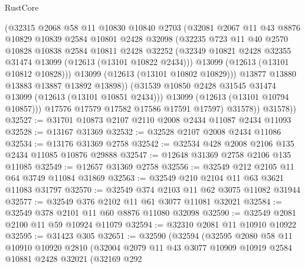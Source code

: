 \begin{lexlean}{RustCore}
\begin{coremodule}
                  (@32315
                    @2068
                    @58
                    @11
                    @10830
                    @10840
                    @2703
                    (@32081
                      @2067
                      @11
                      @43
                      @8876
                      @10829
                      @10839
                      @2584
                      @10801
                      @2428
                      @32098
                      (@32235
                        @723
                        @11
                        @40
                        @2570
                        @10828
                        @10838
                        @2584
                        @10811
                        @2428
                        @32252
                        (@32349 @10821 @2428 @32355 @31474 @13099 (@12613 (@13101 @10822 @2434)))
                        @13099
                        (@12613 (@13101 @10812 @10828)))
                      @13099
                      (@12613 (@13101 @10802 @10829)))
                    @13877
                    @13880
                    @13883
                    @13887
                    @13892
                    @13898))
                (@31539 @10850 @2428 @31545 @31474 @13099 (@12613 (@13101 @10851 @2434)))
                @13099
                (@12613 (@13101 @10794 @10857)))
              @17576
              @17579
              @17582
              @17586
              @17591
              @17597)
            @31578))
        @31578))
@32527 := @31701 @10873 @2107 @2110 @2008 @2434 @11087 @2434 @11093
@32528 := @13167 @31369
@32532 := @32528 @2107 @2008 @2434 @11086
@32534 := @13176 @31369 @2758
@32542 := @32534 @428 @2008 @2106 @135 @2434 @11085 @10876 @29888
@32547 := @12648 @31369 @2758 @2106 @135 @11085
@32549 := @12657 @31369 @2758
@32556 := @32549 @212 @2105 @11 @64 @3749 @11084 @31869
@32563 := @32549 @210 @2104 @11 @63 @3621 @11083 @31797
@32570 := @32549 @374 @2103 @11 @62 @3075 @11082 @31944
@32577 := @32549 @376 @2102 @11 @61 @3077 @11081 @32021
@32584 := @32549 @378 @2101 @11 @60 @8876 @11080 @32098
@32590 := @32549 @2081 @2100 @11 @59 @10924 @11079
@32594 := @32310 @2081 @11 @10910 @10922
@32595 := @31423 @305
@32651 := @32590
    (@32594
      (@32595
        @2080
        @58
        @11
        @10910
        @10920
        @2810
        (@32004
          @2079
          @11
          @43
          @3077
          @10909
          @10919
          @2584
          @10881
          @2428
          @32021
          (@32169
            @292

\end{coremodule}
\end{lexlean}
